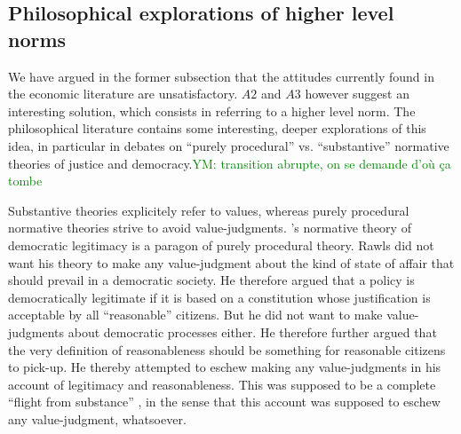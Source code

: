 \documentclass[preprint, french, english, 11pt, authoryear]{elsarticle}%
\newcommand{\commentYM}[1]{\textcolor{green}{YM: #1}}
\begin{document}
\subsection{Philosophical explorations of higher level norms}
We have argued in the former subsection that the attitudes currently found in the economic literature are unsatisfactory. $A2$ and $A3$ however suggest an interesting solution, which consists in referring to a higher level norm. The philosophical literature contains some interesting, deeper explorations of this idea, in particular in debates on “purely procedural” vs. “substantive” normative theories of justice and democracy.\commentYM{transition abrupte, on se demande d'où ça tombe}

Substantive theories explicitely refer to values, whereas purely procedural normative theories strive to avoid value-judgments. \cite{rawls_political_2005}'s normative theory of democratic legitimacy is a paragon of purely procedural theory. Rawls did not want his theory to make any value-judgment about the kind of state of affair that should prevail in a democratic society. He therefore argued that a policy is democratically legitimate if it is based on a constitution whose justification is acceptable by all  “reasonable” citizens. But he did not want to make value-judgments about democratic processes either. He therefore further argued that the very definition of reasonableness should be something for reasonable citizens to pick-up. He thereby attempted to eschew making any value-judgments in his account of legitimacy and reasonableness. This was supposed to be a complete ``flight from substance'' \citep{estlund_democratic_2009}, in the sense that this account was supposed to eschew any value-judgment, whatsoever.%
\end{document}
